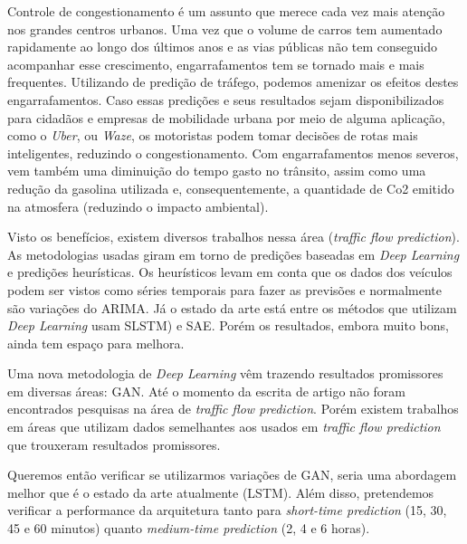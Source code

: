 Controle de congestionamento é um assunto que merece cada vez mais atenção nos grandes centros urbanos. Uma vez que o volume de carros tem aumentado rapidamente ao longo dos últimos anos e as vias públicas não tem conseguido acompanhar esse crescimento, engarrafamentos tem se tornado mais e mais frequentes. Utilizando de predição de tráfego, podemos amenizar os efeitos destes engarrafamentos. Caso essas predições e seus resultados sejam disponibilizados para cidadãos e empresas de mobilidade urbana por meio de alguma aplicação, como o \textit{Uber}, ou \textit{Waze}, os motoristas podem tomar decisões de rotas mais inteligentes, reduzindo o congestionamento. Com engarrafamentos menos severos, vem também uma diminuição do tempo gasto no trânsito, assim como uma redução da gasolina utilizada e, consequentemente, a quantidade de Co2 emitido na atmosfera (reduzindo o impacto ambiental).

Visto os benefícios, existem diversos trabalhos nessa área (\textit{traffic flow prediction}). As metodologias usadas giram em torno de predições baseadas em \textit{Deep Learning} e predições heurísticas. Os heurísticos levam em conta que os dados dos veículos podem ser vistos como séries temporais para fazer as previsões e normalmente são variações do \acrfull{ARIMA}. Já o estado da arte está entre os métodos que utilizam \textit{Deep Learning} usam \acrfull{SLSTM}) e \acrfull{SAE}. Porém os resultados, embora muito bons, ainda tem espaço para melhora.

Uma nova metodologia de \textit{Deep Learning} vêm trazendo resultados promissores em diversas áreas: \acrfull{GAN}. Até o momento da escrita de artigo não foram encontrados pesquisas na área de \textit{traffic flow prediction}. Porém existem trabalhos em áreas que utilizam dados semelhantes aos usados em \textit{traffic flow prediction} que trouxeram resultados promissores. 

Queremos então verificar se utilizarmos variações de \acrshort{GAN}, seria uma abordagem melhor que é o estado da arte atualmente (\acrshort{LSTM}). Além disso, pretendemos verificar a performance da arquitetura tanto para \textit{short-time prediction} (15, 30, 45 e 60 minutos) quanto \textit{medium-time prediction} (2, 4 e 6 horas).

